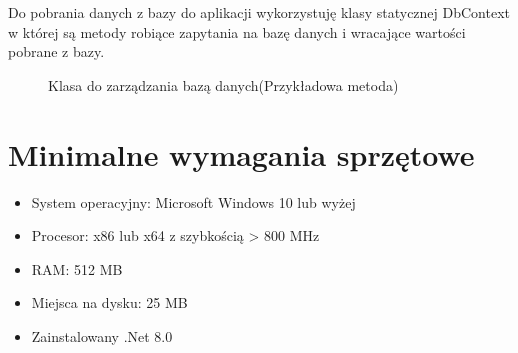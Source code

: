 Do pobrania danych z bazy do aplikacji wykorzystuję klasy statycznej DbContext w której są metody robiące zapytania na bazę danych i wracające wartości pobrane z bazy.

\begin{figure}[H]
    \centering
    \caption{Klasa do zarządzania bazą danych(Przykładowa metoda)}
\end{figure}

\section{Minimalne wymagania sprzętowe}
\begin{itemize}
    \item System operacyjny: Microsoft Windows 10 lub wyżej
    \item Procesor: x86 lub x64 z szybkością > 800 MHz
    \item RAM: 512 MB
    \item Miejsca na dysku: 25 MB
    \item Zainstalowany .Net 8.0
\end{itemize}


